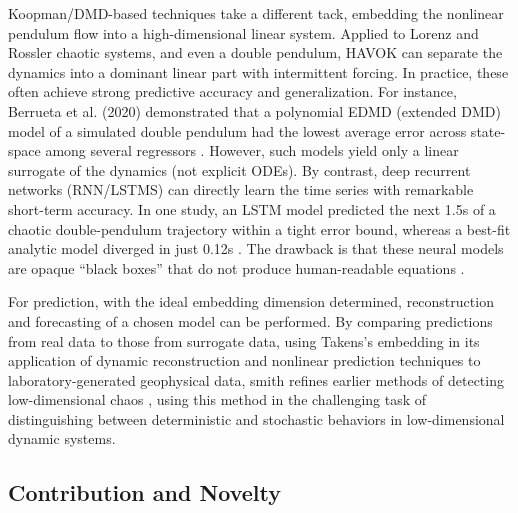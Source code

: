 \documentclass[letterpaper, 10pt, conference]{IEEEtran}
\begin{document}
            Koopman/DMD-based techniques take a different tack, embedding the nonlinear pendulum flow into a high-dimensional linear system. Applied to Lorenz and Rossler chaotic systems, and even a double pendulum, HAVOK can separate the dynamics into a dominant linear part with intermittent forcing\cite{brunton_chaos_2017}. In practice, these often achieve strong predictive accuracy and generalization. For instance, Berrueta et al. (2020) demonstrated that a polynomial EDMD (extended DMD) model of a simulated double pendulum had the lowest average error across state-space among several regressors \cite{mauroy_experimental_2020}. However, such models yield only a linear surrogate of the dynamics (not explicit ODEs). By contrast, deep recurrent networks (RNN/LSTMS) can directly learn the time series with remarkable short-term accuracy. In one study, an LSTM model predicted the next 1.5s of a chaotic double-pendulum trajectory within a tight error bound, whereas a best-fit analytic model diverged in just 0.12s \cite{noauthor_lstm_2024}. The drawback is that these neural models are opaque “black boxes” that do not produce human-readable equations \cite{purnomo_sparse_2023}.
            
            For prediction, with the ideal embedding dimension determined, reconstruction and forecasting of a chosen model can be performed. By comparing predictions from real data to those from surrogate data, using Takens’s embedding in its application of dynamic reconstruction and nonlinear prediction techniques to laboratory-generated geophysical data, smith refines earlier methods of detecting low-dimensional chaos \cite{smith_identification_1992}, using this method in the challenging task of distinguishing between deterministic and stochastic behaviors in low-dimensional dynamic systems.
        
        \subsection{Contribution and Novelty}
        
\end{document}
